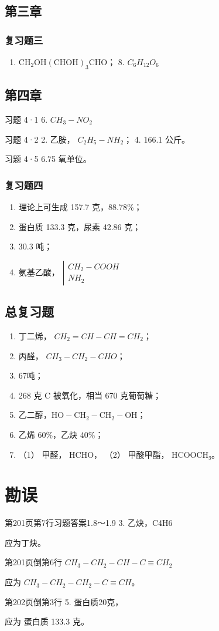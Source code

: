 \section{第三章}

\subsection{复习题三}

\begin{enumerate}[start=7]
\item
  \(\mathrm{CH_{2}OH(CHOH)_{3}CHO}\)； 8. \(C_{6}H_{12}O_{6}\)
\end{enumerate}

\section{第四章}

习题 4·1 6. \(CH_{3}-NO_{2}\)

习题 4·2 2. 乙胺， \(C_{2}H_{5}-NH_{2}\)； 4. 166.1 公斤。

习题 4·5 6.75 氧单位。

\subsection{复习题四}

\begin{enumerate}[start=3]
\item
  理论上可生成 157.7 克，88.78\%；
\item
  蛋白质 133.3 克，尿素 42.86 克；
\item
  30.3 吨；
\item
  氨基乙酸，
  \(\left|\begin{array}{c}CH_{2}-COOH\\NH_{2}\end{array}\right.\)
\end{enumerate}

\section{总复习题}

\begin{enumerate}[start=14]
\item
  丁二烯， \(CH_{2}=CH-CH=CH_{2}\)；
\item
  丙醛， \(CH_{3}-CH_{2}-CHO\)；
\item
  67吨；
\item
  268 克 C 被氧化，相当 670 克葡萄糖；
\item
  乙二醇，\(\mathrm{HO-CH_{2}-CH_{2}-OH}\)；
\item
  乙烯 60\%，乙炔 40\%；
\item
  （1） 甲醛， HCHO， （2） 甲酸甲酯， HCOOCH₃。
\end{enumerate}

\chapter{勘误}

第201页第7行习题答案1.8～1.9 3. 乙炔，C4H6

应为丁炔。

第201页倒第6行 \(CH_{3}-CH_{2}-CH-C\equiv CH_{2}\)

应为 \(CH_{3}-CH_{2}-CH_{2}-C\equiv CH\)。

第202页倒第3行 5. 蛋白质20克，

应为 蛋白质 133.3 克。
